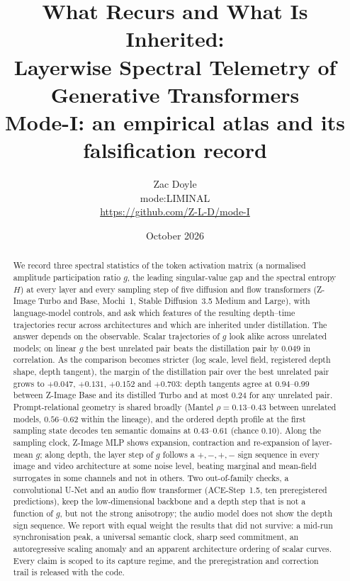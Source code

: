 \documentclass[11pt]{article}
\title{What Recurs and What Is Inherited:\\
Layerwise Spectral Telemetry of Generative Transformers\\[4pt]
\large Mode-I: an empirical atlas and its falsification record}
\author{Zac Doyle\\ \small mode:LIMINAL\\ \small \url{https://github.com/Z-L-D/mode-I}}
\date{October 2026}
\begin{document}
\maketitle

\begin{abstract}
We record three spectral statistics of the token activation matrix (a normalised amplitude participation ratio $g$, the leading singular-value gap and the spectral entropy $H$) at every layer and every sampling step of five diffusion and flow transformers (Z-Image Turbo and Base, Mochi~1, Stable Diffusion~3.5 Medium and Large), with language-model controls, and ask which features of the resulting depth--time trajectories recur across architectures and which are inherited under distillation. The answer depends on the observable. Scalar trajectories of $g$ look alike across unrelated models; on linear $g$ the best unrelated pair beats the distillation pair by $0.049$ in correlation. As the comparison becomes stricter (log scale, level field, registered depth shape, depth tangent), the margin of the distillation pair over the best unrelated pair grows to $+0.047$, $+0.131$, $+0.152$ and $+0.703$: depth tangents agree at $0.94$--$0.99$ between Z-Image Base and its distilled Turbo and at most $0.24$ for any unrelated pair. Prompt-relational geometry is shared broadly (Mantel $\rho=0.13$--$0.43$ between unrelated models, $0.56$--$0.62$ within the lineage), and the ordered depth profile at the first sampling state decodes ten semantic domains at $0.43$--$0.61$ (chance $0.10$). Along the sampling clock, Z-Image MLP shows expansion, contraction and re-expansion of layer-mean $g$; along depth, the layer step of $g$ follows a $+,-,+,-$ sign sequence in every image and video architecture at some noise level, beating marginal and mean-field surrogates in some channels and not in others. Two out-of-family checks, a convolutional U-Net and an audio flow transformer (ACE-Step~1.5, ten preregistered predictions), keep the low-dimensional backbone and a depth step that is not a function of $g$, but not the strong anisotropy; the audio model does not show the depth sign sequence. We report with equal weight the results that did not survive: a mid-run synchronisation peak, a universal semantic clock, sharp seed commitment, an autoregressive scaling anomaly and an apparent architecture ordering of scalar curves. Every claim is scoped to its capture regime, and the preregistration and correction trail is released with the code.
\end{abstract}
\end{document}

